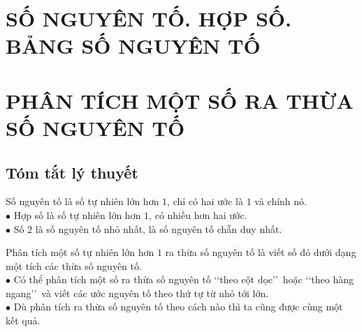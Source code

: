 \section{SỐ NGUYÊN TỐ. HỢP SỐ. BẢNG SỐ NGUYÊN TỐ}
\section{PHÂN TÍCH MỘT SỐ RA THỪA SỐ NGUYÊN TỐ}
\subsection{Tóm tắt lý thuyết}
\begin{enumEX}[1)]{1}
	\item Số nguyên tố là số tự nhiên lớn hơn $1$, chỉ có hai ước là $1$ và chính nó. \\
	$\bullet$ Hợp số là số tự nhiên lớn hơn $1$, có nhiều hơn hai ước. \\
	$\bullet$ Số $2$ là số nguyên tố nhỏ nhất, là số nguyên tố chẵn duy nhất.
	\item Phân tích một số tự nhiên lớn hơn $1$ ra thừa số nguyên tố là viết số đó dưới dạng một tích các thừa số nguyên tố.\\
	$\bullet$ Có thể phân tích một số ra thừa số nguyên tố \lq \lq theo cột dọc\rq \rq \, hoặc \lq \lq theo hàng ngang\rq \rq \, và viết các ước nguyên tố theo thứ tự từ nhỏ tới lớn.\\
	$\bullet$ Dù phân tích ra thừa số nguyên tố theo cách nào thì ta cũng được cùng một kết quả.
\end{enumEX}
